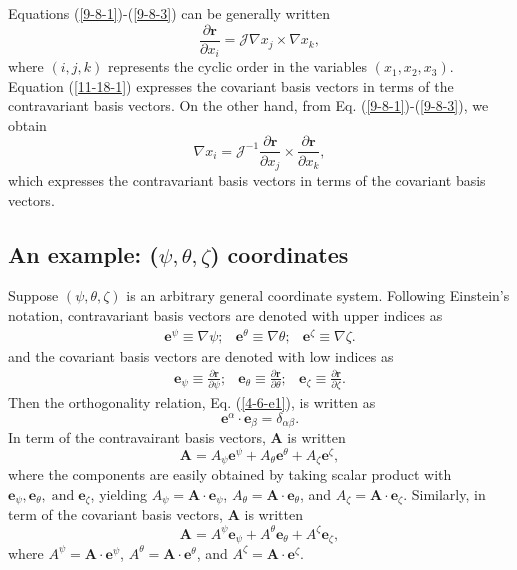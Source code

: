 \documentclass{article}
\newcommand{\tmop}[1]{\ensuremath{\operatorname{#1}}}
\begin{document}
Equations (\ref{9-8-1})-(\ref{9-8-3}) can be generally written
\begin{equation}
  \label{11-18-1} \frac{\partial \mathbf{r}}{\partial x_i} =\mathcal{J} \nabla
  x_j \times \nabla x_k,
\end{equation}
where $(i, j, k)$ represents the cyclic order in the variables $(x_1, x_2,
x_3)$. Equation (\ref{11-18-1}) expresses the covariant basis vectors in terms
of the contravariant basis vectors. On the other hand, from Eq.
(\ref{9-8-1})-(\ref{9-8-3}), we obtain
\begin{equation}
  \label{20-10-15-a1} \nabla x_i =\mathcal{J}^{- 1} \frac{\partial
  \mathbf{r}}{\partial x_j} \times \frac{\partial \mathbf{r}}{\partial x_k},
\end{equation}
which expresses the contravariant basis vectors in terms of the covariant
basis vectors.

\subsection{An example: ($\psi, \theta, \zeta$) coordinates}

Suppose $(\psi, \theta, \zeta)$ is an arbitrary general coordinate system.
Following Einstein's notation, contravariant basis vectors are denoted with
upper indices as
\begin{eqnarray}
  \mathbf{e}^{\psi} \equiv \nabla \psi ; & \mathbf{e}^{\theta} \equiv \nabla
  \theta ; & \mathbf{e}^{\zeta} \equiv \nabla \zeta . 
\end{eqnarray}
and the covariant basis vectors are denoted with low indices as
\begin{eqnarray}
  \mathbf{e}_{\psi} \equiv \frac{\partial \mathbf{r}}{\partial \psi} ; &
  \mathbf{e}_{\theta} \equiv \frac{\partial \mathbf{r}}{\partial \theta} ; &
  \mathbf{e}_{\zeta} \equiv \frac{\partial \mathbf{r}}{\partial \zeta} . 
\end{eqnarray}
Then the orthogonality relation, Eq. (\ref{4-6-e1}), is written as
\begin{equation}
  \mathbf{e}^{\alpha} \cdot \mathbf{e}_{\beta} = \delta_{\alpha \beta} .
\end{equation}
In term of the contravairant basis vectors, $\mathbf{A}$ is written
\begin{equation}
  \label{9-8-8} \mathbf{A}= A_{\psi} \mathbf{e}^{\psi} + A_{\theta}
  \mathbf{e}^{\theta} + A_{\zeta} \mathbf{e}^{\zeta},
\end{equation}
where the components are easily obtained by taking scalar product with
$\mathbf{e}_{\psi}, \mathbf{e}_{\theta}, \tmop{and} \mathbf{e}_{\zeta}$,
yielding $A_{\psi} =\mathbf{A} \cdot \mathbf{e}_{\psi}$, $A_{\theta}
=\mathbf{A} \cdot \mathbf{e}_{\theta}$, and $A_{\zeta} =\mathbf{A} \cdot
\mathbf{e}_{\zeta}$. Similarly, in term of the covariant basis vectors,
$\mathbf{A}$ is written
\begin{equation}
  \label{9-8-7} \mathbf{A}= A^{\psi} \mathbf{e}_{\psi} + A^{\theta}
  \mathbf{e}_{\theta} + A^{\zeta} \mathbf{e}_{\zeta},
\end{equation}
where $A^{\psi} =\mathbf{A} \cdot \mathbf{e}^{\psi}$, $A^{\theta} =\mathbf{A}
\cdot \mathbf{e}^{\theta}$, and $A^{\zeta} =\mathbf{A} \cdot
\mathbf{e}^{\zeta}$.
\end{document}
